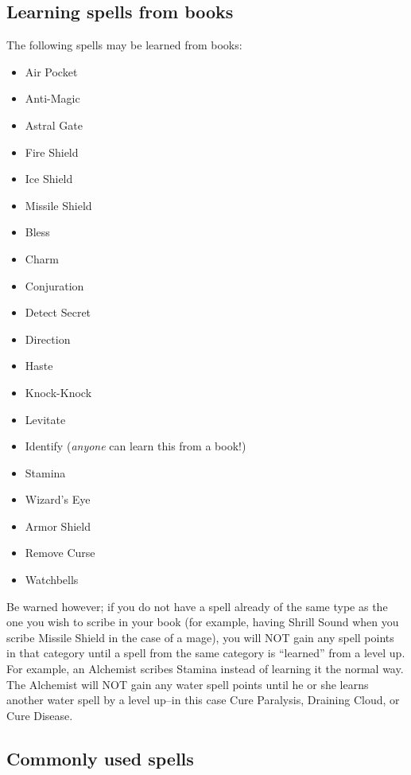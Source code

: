 \documentclass[12pt]{article}
\providecommand{\tightlist}{%
  \setlength{\itemsep}{0pt}\setlength{\parskip}{0pt}}
\begin{document}
\subsection{Learning spells from
books}\label{learning-spells-from-books}

The following spells may be learned from books:

\begin{itemize}
\tightlist
\item
  Air Pocket
\item
  Anti-Magic
\item
  Astral Gate
\item
  Fire Shield
\item
  Ice Shield
\item
  Missile Shield
\item
  Bless
\item
  Charm
\item
  Conjuration
\item
  Detect Secret
\item
  Direction
\item
  Haste
\item
  Knock-Knock
\item
  Levitate
\item
  Identify (\emph{anyone} can learn this from a book!)
\item
  Stamina
\item
  Wizard's Eye
\item
  Armor Shield
\item
  Remove Curse
\item
  Watchbells
\end{itemize}

Be warned however; if you do not have a spell already of the same type
as the one you wish to scribe in your book (for example, having Shrill
Sound when you scribe Missile Shield in the case of a mage), you will
NOT gain any spell points in that category until a spell from the same
category is ``learned'' from a level up. For example, an Alchemist
scribes Stamina instead of learning it the normal way. The Alchemist
will NOT gain any water spell points until he or she learns another
water spell by a level up--in this case Cure Paralysis, Draining Cloud,
or Cure Disease.

\subsection{Commonly used spells}\label{commonly-used-spells}
\end{document}
